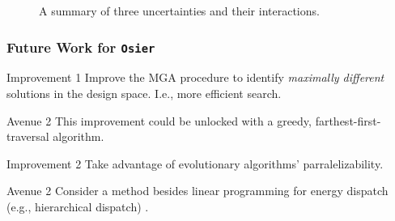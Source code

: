 \begin{frame}
\begin{figure}
{
        }
        \caption{A summary of three uncertainties and their interactions.}
        \label{fig:triarchic-uncertainty}
    \end{figure}

\end{frame}

\begin{frame}
    \frametitle{Future Work for \texttt{Osier}}

    \begin{block}{Improvement 1}
        Improve the MGA procedure to identify \textit{maximally different} solutions in the design space.
        I.e., more efficient search.
    \end{block}
    \begin{block}{Avenue 2}
        This improvement could be unlocked with a greedy, farthest-first-traversal algorithm.
    \end{block}
    \begin{block}{Improvement 2}
        Take advantage of evolutionary algorithms' parralelizability.
    \end{block}
    \begin{block}{Avenue 2}
        Consider a method besides linear programming for energy dispatch (e.g., hierarchical dispatch) \cite{prina_multi-objective_2020}.
    \end{block}

\end{frame}